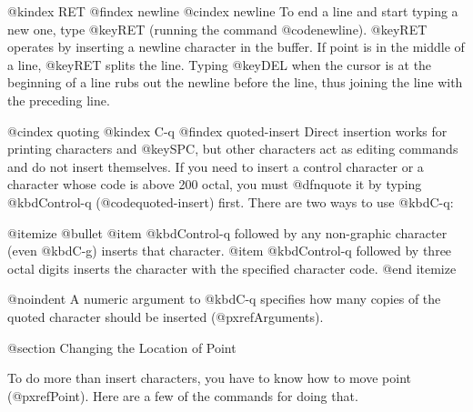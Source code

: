{{@kindex RET
@findex newline
@cindex newline
   To end a line and start typing a new one, type @key{RET} (running the
command @code{newline}).  @key{RET} operates by inserting a newline
character in the buffer.  If point is in the middle of a line, @key{RET}
splits the line.  Typing @key{DEL} when the cursor is at the beginning of a
line rubs out the newline before the line, thus joining the line with the
preceding line.

@cindex quoting
@kindex C-q
@findex quoted-insert
  Direct insertion works for printing characters and @key{SPC}, but other
characters act as editing commands and do not insert themselves.  If you
need to insert a control character or a character whose code is above 200
octal, you must @dfn{quote} it by typing @kbd{Control-q} (@code{quoted-insert}) first.
There are two ways to use @kbd{C-q}:

@itemize @bullet
@item
@kbd{Control-q} followed by any non-graphic character (even @kbd{C-g})
inserts that character.
@item
@kbd{Control-q} followed by three octal digits inserts the character
with the specified character code.
@end itemize

@noindent
A numeric argument to @kbd{C-q} specifies how many copies of the
quoted character should be inserted (@pxref{Arguments}).

@section Changing the Location of Point

  To do more than insert characters, you have to know how to move
point (@pxref{Point}).  Here are a few of the commands for doing that.

}}
